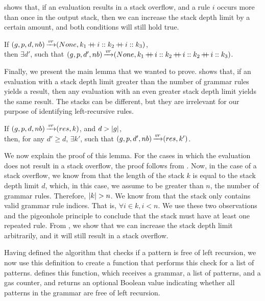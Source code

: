  shows that,
if an evaluation results in a stack overflow,
and a rule $i$ occurs more than once in the output stack,
then we can increase the stack depth limit by a certain amount,
and both conditions will still hold true.

\begin{lemma}%
    If $(g,p,d,nb) \operatorname{\xrightarrow{\mathit{vr}}} (None,k_1 \operatorname{+\kern -0.4em+} i :: k_2 \operatorname{+\kern -0.4em+} i :: k_3)$, \\
    then $\exists d'$,
    such that $(g,p,d',nb) \operatorname{\xrightarrow{\mathit{vr}}} (None,k_1 \operatorname{+\kern -0.4em+} i :: k_2 \operatorname{+\kern -0.4em+} i :: k_2 \operatorname{+\kern -0.4em+} i :: k_3)$.
    \label{lemma:repeated-rule-in-stack}
\end{lemma}

Finally, we present the main lemma
that we wanted to prove.
shows that,
if an evaluation with a stack depth limit
greater than the number of grammar rules
yields a result,
then any evaluation with an even greater stack depth limit
yields the same result.
The stacks can be different,
but they are irrelevant
for our purpose of identifying
left-recursive rules.

\begin{lemma}%
    If $(g,p,d,nb) \operatorname{\xrightarrow{\mathit{vr}}} (res,k)$, and $d > |g|$, \\
    then, for any $d' \ge d$,
    $\exists k'$,
    such that $(g,p,d',nb) \operatorname{\xrightarrow{\mathit{vr}}} (res,k')$.
    \label{lemma:stack-depth-convergence}
\end{lemma}

We now explain the proof of this lemma.
For the cases in which the evaluation
does not result in a stack overflow,
the proof follows from .
Now, in the case of a stack overflow,
we know from 
that the length of the stack $k$ is equal to the stack depth limit $d$,
which, in this case, we assume to be greater than $n$, the number of grammar rules.
Therefore, $|k| > n$.
We know from 
that the stack only contains valid grammar rule indices.
That is, $\forall i \in k, i < n$.
We use these two observations and the pigeonhole principle to conclude
that the stack must have at least one repeated rule.
From ,
we show that we can increase the stack depth limit arbitrarily,
and it will still result in a stack overflow.

Having defined the algorithm
that checks if a pattern is free of left recursion,
we now use this definition to create a function
that performs this check for a list of patterns.
 defines this function,
which receives a grammar, a list of patterns,
and a gas counter,
and returns an optional Boolean value
indicating whether all patterns in the grammar
are free of left recursion.

